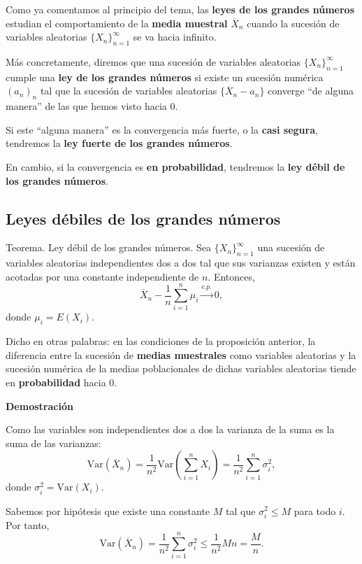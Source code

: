 \documentclass[]{book}
\begin{document}
Como ya comentamos al principio del tema, las \textbf{leyes de los grandes números} estudian el comportamiento de la \textbf{media muestral} \(\overline{X}_n\) cuando la sucesión de variables aleatorias \(\{X_n\}_{n=1}^\infty\) se va hacia infinito.

Más concretamente, diremos que una sucesión de variables aleatorias \(\{X_n\}_{n=1}^\infty\) cumple una \textbf{ley de los grandes números} si existe un sucesión numérica \((a_n)_n\) tal que la sucesión de variables aleatorias \(\{\overline{X}_n-a_n\}\) converge ``de alguna manera'' de las que hemos visto hacia 0.

Si este ``alguna manera'' es la convergencia más fuerte, o la \textbf{casi segura}, tendremos la \textbf{ley fuerte de los grandes números}.

En cambio, si la convergencia es \textbf{en probabilidad}, tendremos la \textbf{ley débil de los grandes números}.

\hypertarget{leyes-duxe9biles-de-los-grandes-nuxfameros}{%
\subsection{Leyes débiles de los grandes números}\label{leyes-duxe9biles-de-los-grandes-nuxfameros}}

 Teorema. Ley débil de los grandes números.
Sea \(\{X_n\}_{n=1}^\infty\) una sucesión de variables aleatorias independientes dos a dos tal que sus varianzas existen y están acotadas por una constante independiente de \(n\). Entonces,
\[
\overline{X}_n-\frac{1}{n}\sum_{i=1}^n \mu_i\stackrel{c.p.}{\longrightarrow} 0,
\]
donde \(\mu_i = E(X_i)\).

Dicho en otras palabras: en las condiciones de la proposición anterior, la diferencia entre la sucesión de \textbf{medias muestrales} como variables aleatorias y la sucesión numérica de la medias poblacionales de dichas variables aleatorias tiende en \textbf{probabilidad} hacia 0.

\textbf{Demostración}

Como las variables son independientes dos a dos la varianza de la suma es la suma de las varianzas:
\[
\mathrm{Var}(\overline{X}_n)=\frac{1}{n^2}\mathrm{Var}(\sum_{i=1}^n X_i)=\frac{1}{n^2}\sum_{i=1}^n \sigma_i^2,
\]
donde \(\sigma_i^2 = \mathrm{Var}(X_i)\).

Sabemos por hipótesis que existe una constante \(M\) tal que \(\sigma_i^2\leq M\) para todo \(i\). Por tanto,
\[
\mathrm{Var}(\overline{X}_n)=\frac{1}{n^2}\sum_{i=1}^n \sigma_i^2\leq \frac{1}{n^2}Mn =\frac{M}{n}.
\]
\end{document}
